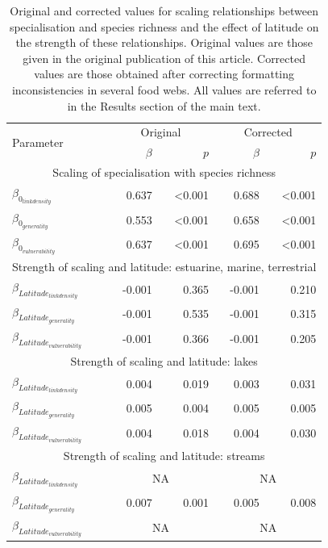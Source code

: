 \documentclass[12pt]{article}
\begin{document}
\begin{spacing}{2.0}
\begin{table}[h!]
\caption{Original and corrected values for scaling relationships between specialisation and species richness and the effect of latitude on the strength of these relationships. Original values are those given in the original publication of this article. Corrected values are those obtained after correcting formatting inconsistencies in several food webs. All values are referred to in the Results section of the main text.}
\label{beta_comparison}
\small
\begin{tabular}{l | r r | r r}
\multirow{2}{*}{Parameter} & \multicolumn{2}{c|}{Original} & \multicolumn{2}{c}{Corrected} \\
& $\beta$ & $p$ & $\beta$ & $p$ \\
\hline
\multicolumn{5}{c}{Scaling of specialisation with species richness} \\
\hline
$\beta_{0_{link density}}$ & 0.637 & \textless0.001 & 0.688 & \textless0.001 \\
$\beta_{0_{generality}}$ & 0.553 & \textless0.001 & 0.658 & \textless0.001 \\
$\beta_{0_{vulnerability}}$ & 0.637 & \textless0.001 & 0.695 & \textless0.001 \\
\hline
\multicolumn{5}{c}{Strength of scaling and latitude: estuarine, marine, terrestrial} \\
\hline
$\beta_{{Latitude}_{link density}}$ & -0.001 & 0.365 & -0.001 & 0.210 \\
$\beta_{{Latitude}_{generality}}$ & -0.001 & 0.535 & -0.001 & 0.315 \\
$\beta_{{Latitude}_{vulnerability}}$ & -0.001 & 0.366 & -0.001 & 0.205 \\
\hline
\multicolumn{5}{c}{Strength of scaling and latitude: lakes} \\
\hline
$\beta_{{Latitude}_{link density}}$ & 0.004 & 0.019 & 0.003 & 0.031 \\
$\beta_{{Latitude}_{generality}}$ & 0.005 & 0.004 & 0.005 & 0.005 \\
$\beta_{{Latitude}_{vulnerability}}$ & 0.004 & 0.018 & 0.004 & 0.030 \\
\hline
\multicolumn{5}{c}{Strength of scaling and latitude: streams} \\
\hline
$\beta_{{Latitude}_{link density}}$ & \multicolumn{2}{c|}{NA} & \multicolumn{2}{c}{NA} \\
$\beta_{{Latitude}_{generality}}$ & 0.007 & 0.001 & 0.005 & 0.008 \\
$\beta_{{Latitude}_{vulnerability}}$ & \multicolumn{2}{c|}{NA} & \multicolumn{2}{c}{NA} \\
\end{tabular}
\end{table}



\end{spacing}
\end{document}
